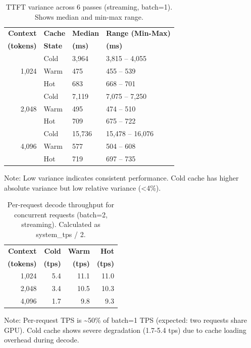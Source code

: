 
\begin{table}[t]
\centering
\caption{TTFT variance across 6 passes (streaming, batch=1).
Shows median and min-max range.}
\label{tab:ttft-variance}
\begin{tabular}{rlll}
\toprule
\textbf{Context} & \textbf{Cache} & \textbf{Median} & \textbf{Range (Min-Max)} \\
\textbf{(tokens)} & \textbf{State} & \textbf{(ms)} & \textbf{(ms)} \\
\midrule
\multirow{3}{*}{1,024}
  & Cold & 3,964 & 3,815 -- 4,055 \\
  & Warm & 475   & 455 -- 539 \\
  & Hot  & 683   & 668 -- 701 \\
\midrule
\multirow{3}{*}{2,048}
  & Cold & 7,119 & 7,075 -- 7,250 \\
  & Warm & 495   & 474 -- 510 \\
  & Hot  & 709   & 675 -- 722 \\
\midrule
\multirow{3}{*}{4,096}
  & Cold & 15,736 & 15,478 -- 16,076 \\
  & Warm & 577    & 504 -- 608 \\
  & Hot  & 719    & 697 -- 735 \\
\bottomrule
\end{tabular}
\vspace{0.5em}
\small
Note: Low variance indicates consistent performance.
Cold cache has higher absolute variance but low relative variance (<4\%).
\end{table}


\begin{table}[t]
\centering
\caption{Per-request decode throughput for concurrent requests (batch=2, streaming).
Calculated as system\_tps / 2.}
\label{tab:batch2-tps}
\begin{tabular}{rrrr}
\toprule
\textbf{Context} & \textbf{Cold} & \textbf{Warm} & \textbf{Hot} \\
\textbf{(tokens)} & \textbf{(tps)} & \textbf{(tps)} & \textbf{(tps)} \\
\midrule
1,024  & 5.4  & 11.1 & 11.0 \\
2,048  & 3.4  & 10.5 & 10.3 \\
4,096  & 1.7  & 9.8  & 9.3 \\
\bottomrule
\end{tabular}
\vspace{0.5em}
\small
Note: Per-request TPS is \textasciitilde50\% of batch=1 TPS (expected: two requests share GPU).
Cold cache shows severe degradation (1.7-5.4 tps) due to cache loading overhead during decode.
\end{table}

